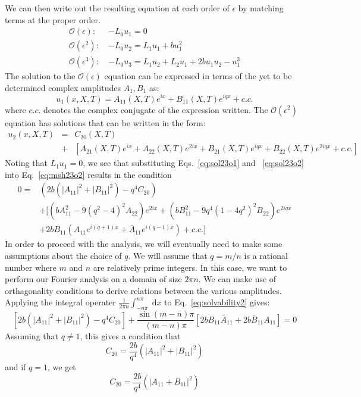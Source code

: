 \documentclass[api,pof,pre,12pt,a4paper]{revtex4-1}
\newcommand{\beqn}{\begin{equation}}
\newcommand{\eeqn}{\end{equation}}
\newcommand{\beqa}{\begin{eqnarray}}
\newcommand{\eeqa}{\end{eqnarray}}
\begin{document}
We can then write out the resulting equation at each order of $\epsilon$ by matching terms at the proper order.
\begin{subequations}
\begin{align}
\mathcal{O}(\epsilon): \:  &-L_0 u_1 =0
\label{eq:msh23o1} \\
\mathcal{O}(\epsilon^2): \: &-L_0 u_2 = L_1 u_1 +b u_1^2
\label{eq:msh23o2} \\
\mathcal{O}(\epsilon^3): \:  &-L_0 u_3 = L_1 u_2 +L_2 u_1 + 2b u_1 u_2-u_1^3
\label{eq:msh23o3}
\end{align}
\end{subequations}
The solution to the $\mathcal{O}(\epsilon)$ equation can be expressed in terms of the yet to be determined complex amplitudes $A_1, B_1$ as:
\beqn
u_1(x,X,T)=A_{11}(X,T)e^{i x} +B_{11}(X,T)e^{i q x} +c.c.
\label{eq:sol23o1}
\eeqn
where $c.c.$ denotes the complex conjugate of the expression written.  The  $\mathcal{O}(\epsilon^2)$ equation has solutions that can be written in the form:
\beqa
u_2(x,X,T)&=&C_{20}(X,T)  \\
&+ &\left[ A_{21}(X,T)e^{i x}+A_{22}(X,T)e^{2 i x} +B_{21}(X,T)e^{i q x} + B_{22}(X,T)e^{2 i q x} +c.c.\right]\nonumber
\label{eq:sol23o2}
\eeqa
Noting that $L_1 u_1=0$, we see that substituting Eqs.~\ref{eq:sol23o1} and ~\ref{eq:sol23o2} into Eq.~\ref{eq:msh23o2} results in the condition
\begin{align}
	0=& \left(2 b (|A_{11}|^2+|B_{11}|^2)-q^4 C_{20} \right) \nonumber \\
 &+\biggl[ \left(b A_{11}^2-9(q^2-4)^2A_{22}\right)e^{2 i x} +\left(b B_{11}^2-9q^4 (1-4q^2)^2 B_{22}\right)e^{2 i q x} \nonumber \\
&+2b B_{11}\left(A_{11}e^{i(q+1)x}+\bar{A}_{11}e^{i(q-1)x} \right)+ c.c.\biggr]
\label{eq:solvability2}
\end{align}
In order to proceed with the analysis, we will eventually need to make some assumptions about the choice of $q$.  We will assume that $q=m/n$ is a rational number where $m$ and $n$ are relatively prime integers. In this case, we want to perform our Fourier analysis on a domain of size $2\pi n$.
We can make use of orthagonality conditions to derive relations between the various amplitudes.  Applying the integral operater $\tfrac{1}{2\pi n}\int_{-n\pi }^{ n\pi} \; \text{d}x$ to Eq.~\ref{eq:solvability2} gives:
\beqn
 \left[2 b (|A_{11}|^2+|B_{11}|^2)-q^4 C_{20} \right] +\frac{ \sin(m-n)\pi}{(m-n)\pi} \left[2  b B_{11} \bar{A}_{11}+2  b\bar{B}_{11} A_{11} \right]=0
\eeqn
Assuming that $q\neq 1$, this gives a condition that 
\beqn
C_{20}=\frac{2 b}{q^4} (|A_{11}|^2+|B_{11}|^2)
\eeqn
and if $q=1$, we get
\beqn
C_{20}=\frac{2 b}{q^4} (|A_{11}+B_{11}|^2)
\eeqn
\end{document}
